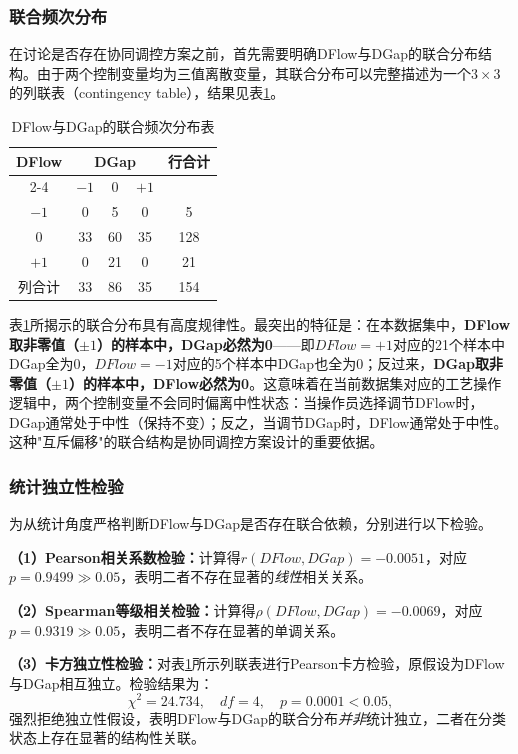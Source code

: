 \documentclass[UTF8,a4paper,12pt]{ctexart}
\begin{document}
\subsubsection{联合频次分布}

在讨论是否存在协同调控方案之前，首先需要明确DFlow与DGap的联合分布结构。由于两个控制变量均为三值离散变量，其联合分布可以完整描述为一个$3\times3$的列联表（contingency table），结果见表\ref{tab:joint}。

\begin{table}[H]
\centering
\caption{DFlow与DGap的联合频次分布表}
\label{tab:joint}
\begin{tabular}{c|ccc|c}
\toprule
\multirow{2}{*}{DFlow} & \multicolumn{3}{c|}{DGap} & \multirow{2}{*}{行合计} \\
\cmidrule(lr){2-4}
& $-1$ & $0$ & $+1$ & \\
\midrule
$-1$ & 0  & 5  & 0  & 5 \\
$0$  & 33 & 60 & 35 & 128 \\
$+1$ & 0  & 21 & 0  & 21 \\
\midrule
列合计 & 33 & 86 & 35 & 154 \\
\bottomrule
\end{tabular}
\end{table}

表\ref{tab:joint}所揭示的联合分布具有高度规律性。最突出的特征是：在本数据集中，\textbf{DFlow取非零值（$\pm1$）的样本中，DGap必然为0}——即$DFlow=+1$对应的21个样本中DGap全为0，$DFlow=-1$对应的5个样本中DGap也全为0；反过来，\textbf{DGap取非零值（$\pm1$）的样本中，DFlow必然为0}。这意味着在当前数据集对应的工艺操作逻辑中，两个控制变量不会同时偏离中性状态：当操作员选择调节DFlow时，DGap通常处于中性（保持不变）；反之，当调节DGap时，DFlow通常处于中性。这种"互斥偏移"的联合结构是协同调控方案设计的重要依据。

\subsubsection{统计独立性检验}

为从统计角度严格判断DFlow与DGap是否存在联合依赖，分别进行以下检验。

\textbf{（1）Pearson相关系数检验：}计算得$r(DFlow,DGap)=-0.0051$，对应$p=0.9499\gg0.05$，表明二者不存在显著的\textit{线性}相关关系。

\textbf{（2）Spearman等级相关检验：}计算得$\rho(DFlow,DGap)=-0.0069$，对应$p=0.9319\gg0.05$，表明二者不存在显著的单调关系。

\textbf{（3）卡方独立性检验：}对表\ref{tab:joint}所示列联表进行Pearson卡方检验，原假设为DFlow与DGap相互独立。检验结果为：
\begin{equation}
\chi^2=24.734,\quad df=4,\quad p=0.0001<0.05,
\end{equation}
强烈拒绝独立性假设，表明DFlow与DGap的联合分布\textit{并非}统计独立，二者在分类状态上存在显著的结构性关联。
\end{document}
